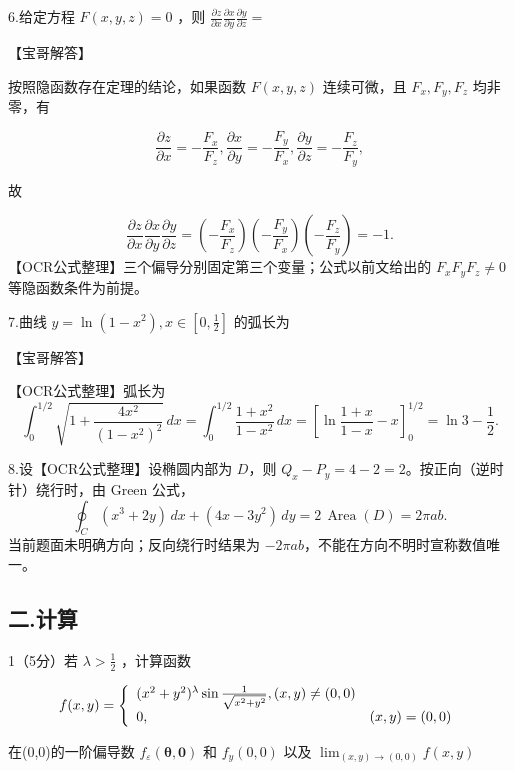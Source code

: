 \documentclass[11pt,fontset=fandol]{ctexart}
\begin{document}
6.给定方程 \(F ( x , y , z ) = 0\) ，则
\(\frac { \partial z } { \partial x } \frac { \partial x } { \partial y } \frac { \partial y } { \partial z } =\)

【宝哥解答】

按照隐函数存在定理的结论，如果函数 \(F ( x , y , z )\) 连续可微，且
\(F _ { x } , F _ { y } , F _ { z }\) 均非零，有

\[
\frac { \partial z } { \partial x } = - \frac { F _ { x } } { F _ { z } } , \frac { \partial x } { \partial y } = - \frac { F _ { y } } { F _ { x } } , \frac { \partial y } { \partial z } = - \frac { F _ { z } } { F _ { y } } ,
\]

故

\[
\frac{\partial z}{\partial x}\frac{\partial x}{\partial y}\frac{\partial y}{\partial z}
=\left(-\frac{F_x}{F_z}\right)\left(-\frac{F_y}{F_x}\right)
\left(-\frac{F_z}{F_y}\right)=-1.
\] 【OCR公式整理】三个偏导分别固定第三个变量；公式以前文给出的
\(F_xF_yF_z\ne0\) 等隐函数条件为前提。

7.曲线
\(y = \ln ( 1 - x ^ { 2 } ) , x \in \left[ 0 , \frac { 1 } { 2 } \right]\)
的弧长为

【宝哥解答】

【OCR公式整理】弧长为 \[
\int_0^{1/2}\sqrt{1+\frac{4x^2}{(1-x^2)^2}}\,dx
=\int_0^{1/2}\frac{1+x^2}{1-x^2}\,dx
=\left[\ln\frac{1+x}{1-x}-x\right]_0^{1/2}
=\ln3-\frac12.
\]

8.设【OCR公式整理】设椭圆内部为 \(D\)，则
\(Q_x-P_y=4-2=2\)。按正向（逆时针）绕行时，由 Green 公式， \[
\oint_C(x^3+2y)\,dx+(4x-3y^2)\,dy=2\,\operatorname{Area}(D)=2\pi ab.
\] 当前题面未明确方向；反向绕行时结果为
\(-2\pi ab\)，不能在方向不明时宣称数值唯一。

\subsection{二.计算}\label{ux4e8c.ux8ba1ux7b97}

1（5分）若 \(\lambda > \frac { 1 } { 2 }\) ，计算函数

\[
f ( x , y ) = \left\{ \begin{array} { l l } { ( x ^ { 2 } + y ^ { 2 } ) ^ { \lambda } \sin \frac { 1 } { \sqrt { x ^ { 2 } + y ^ { 2 } } } , ( x , y ) \neq ( 0 , 0 ) } \\ { 0 , \ } & { ( x , y ) = ( 0 , 0 ) } \end{array} \right.
\]

在(0,0)的一阶偏导数
\(f _ { \varepsilon } ( \pmb { \theta } , \pmb { 0 } )\) 和
\({ f _ { y } } ( 0 , 0 )\) 以及
\(\lim _ { ( x , y ) \to ( 0 , 0 ) } f ( x , y )\)
\end{document}
